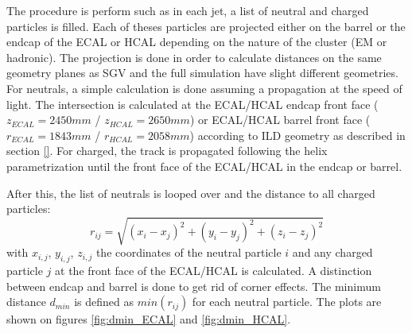 The procedure is perform such as in each jet, a list of neutral and charged particles is filled. Each of theses particles are projected either on the barrel or the endcap of the ECAL or HCAL depending on the nature of the cluster (EM or hadronic). The projection is done in order to calculate distances on the same geometry planes as SGV and the full simulation have slight different geometries. For neutrals, a simple calculation is done assuming a propagation at the speed of light. The intersection is calculated at the ECAL/HCAL endcap front face ($z_{ECAL} = 2450 mm$ / $z_{HCAL} = 2650 mm$) or ECAL/HCAL barrel front face ($r_{ECAL} = 1843 mm$ / $r_{HCAL} = 2058 mm$) according to ILD geometry as described in section \ref{}. For charged, the \lcio track is propagated following the helix parametrization until the front face of the ECAL/HCAL in the endcap or barrel.

After this, the list of neutrals is looped over and the distance to all charged particles:
\begin{equation}
  r_{ij} = \sqrt{(x_i - x_j)^2 + (y_i - y_j)^2 + (z_i - z_j)^2}
\end{equation}
with $x_{i,j}$, $y_{i,j}$, $z_{i,j}$ the coordinates of the neutral particle $i$ and any charged particle $j$ at the front face of the ECAL/HCAL is calculated. A distinction between endcap and barrel is done to get rid of corner effects. The minimum distance $d_{min}$ is defined as $min(r_{ij})$ for each neutral particle. The plots are shown on figures \ref{fig:dmin_ECAL} and \ref{fig:dmin_HCAL}.

